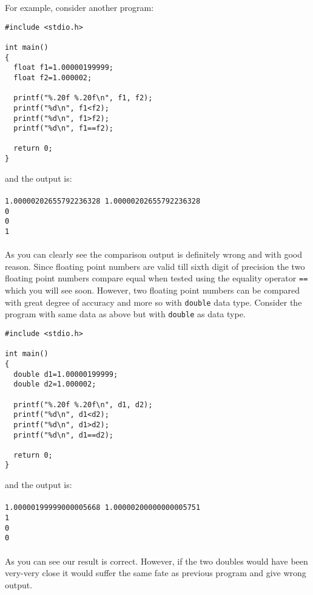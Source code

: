 For example, consider another program:
\begin{verbatim}
#include <stdio.h>

int main()
{
  float f1=1.00000199999;
  float f2=1.000002;

  printf("%.20f %.20f\n", f1, f2);
  printf("%d\n", f1<f2);
  printf("%d\n", f1>f2);
  printf("%d\n", f1==f2);

  return 0;
}
\end{verbatim}
and the output is:
\\\\\texttt{1.00000202655792236328 1.00000202655792236328\\
0\\
0\\
1\\\\}
As you can clearly see the comparison output is definitely wrong and with good
reason. Since floating point numbers are valid till sixth digit of precision
the two floating point numbers compare equal when tested using the equality
operator \texttt{==} which you will see soon. However, two floating point
numbers can be compared with great degree of accuracy and more so with
\texttt{double} data type. Consider the program with same data as above but
with \texttt{double} as data type.

\begin{verbatim}
#include <stdio.h>

int main()
{
  double d1=1.00000199999;
  double d2=1.000002;

  printf("%.20f %.20f\n", d1, d2);
  printf("%d\n", d1<d2);
  printf("%d\n", d1>d2);
  printf("%d\n", d1==d2);

  return 0;
}
\end{verbatim}
and the output is:
\\\\\texttt{1.00000199999000005668 1.00000200000000005751\\
1\\
0\\
0\\\\}
As you can see our result is correct. However, if the two doubles would have
been very-very close it would suffer the same fate as previous program and give
wrong output.


